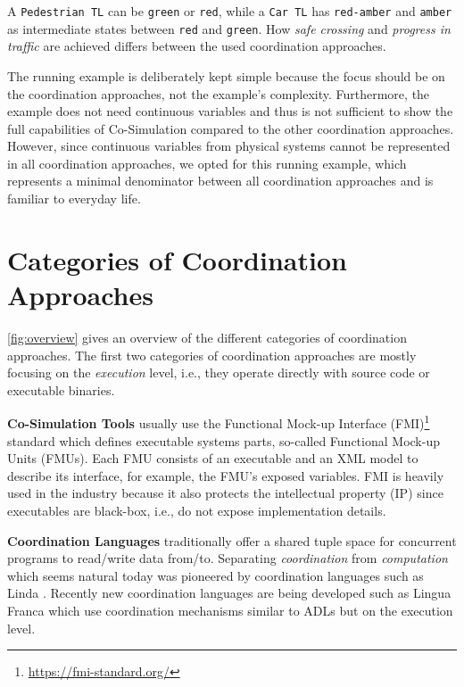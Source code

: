 \documentclass[runningheads]{llncs}
\begin{document}
A \texttt{Pedestrian TL} can be \texttt{green} or \texttt{red}, while a \texttt{Car TL} has \texttt{red-amber} and \texttt{amber} as intermediate states between \texttt{red} and \texttt{green}.
How \textit{safe crossing} and \textit{progress in traffic} are achieved differs between the used coordination approaches.

The running example is deliberately kept simple because the focus should be on the coordination approaches, not the example's complexity.
Furthermore, the example does not need continuous variables and thus is not sufficient to show the full capabilities of Co-Simulation compared to the other coordination approaches.
However, since continuous variables from physical systems cannot be represented in all coordination approaches, we opted for this running example, which represents a minimal denominator between all coordination approaches and is familiar to everyday life.

\section{Categories of Coordination Approaches} \label{sec:approaches}

\autoref{fig:overview} gives an overview of the different categories of coordination approaches.
The first two categories of coordination approaches are mostly focusing on the \textit{execution} level, i.e., they operate directly with source code or executable binaries.

\textbf{Co-Simulation Tools} usually use the Functional Mock-up Interface (FMI)\footnote{\url{https://fmi-standard.org/}} standard which defines executable systems parts, so-called Functional Mock-up Units (FMUs).
Each FMU consists of an executable and an XML model to describe its interface, for example, the FMU's exposed variables.
FMI is heavily used in the industry because it also protects the intellectual property (IP) since executables are black-box, i.e., do not expose implementation details.

\textbf{Coordination Languages} traditionally offer a shared tuple space for concurrent programs to read/write data from/to.
Separating \textit{coordination} from \textit{computation} which seems natural today was pioneered by coordination languages such as Linda \cite{carrieroLindaContext1989}.
Recently new coordination languages are being developed such as Lingua Franca \cite{lohstrohReactorsDeterministicModel2020} which use coordination mechanisms similar to ADLs but on the execution level.
\end{document}
